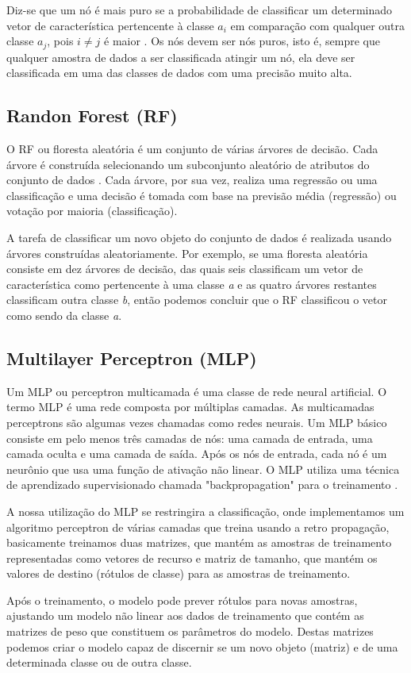Diz-se que um nó é mais puro se a probabilidade de classificar um determinado vetor de característica pertencente à classe $a_i$ em comparação com qualquer outra classe $a_j$, pois $i \not= j$ é maior \cite{scikit-learn}. Os nós devem ser nós puros, isto é, sempre que qualquer amostra de dados a ser classificada atingir um nó, ela deve ser classificada em uma das classes de dados com uma precisão muito alta.  

\subsection{Randon Forest (RF)} 

O RF ou floresta aleatória é um conjunto de várias árvores de decisão. Cada árvore é construída selecionando um subconjunto aleatório de atributos do conjunto de dados \cite{scikit-learn}. Cada árvore, por sua vez, realiza uma regressão ou uma classificação e uma decisão é tomada com base na previsão média (regressão) ou votação por maioria (classificação).  

A tarefa de classificar um novo objeto do conjunto de dados é realizada usando árvores construídas aleatoriamente.  Por exemplo, se uma floresta aleatória consiste em dez árvores de decisão, das quais seis classificam um vetor de característica como pertencente à uma classe \textit{a}  e as quatro árvores restantes classificam outra classe \textit{b}, então podemos concluir que o RF classificou o vetor como sendo da classe \textit{a}.  

\subsection{Multilayer Perceptron (MLP)} 

Um MLP ou perceptron multicamada é uma classe de rede neural artificial. O termo MLP é uma rede composta por múltiplas camadas. As multicamadas perceptrons são algumas vezes chamadas como redes neurais. Um MLP básico consiste em pelo menos três camadas de nós: uma camada de entrada, uma camada oculta e uma camada de saída. Após os nós de entrada, cada nó é um neurônio que usa uma função de ativação não linear. O MLP utiliza uma técnica de aprendizado supervisionado chamada "backpropagation" para o treinamento \cite{astroml}.  

A nossa utilização do MLP se restringira a classificação, onde implementamos um algoritmo perceptron de várias camadas que treina usando a retro propagação, basicamente treinamos duas matrizes, que mantém as amostras de treinamento representadas como vetores de recurso e matriz de tamanho, que mantém os valores de destino (rótulos de classe) para as amostras de treinamento.  

Após o treinamento, o modelo pode prever rótulos para novas amostras, ajustando um modelo não linear aos dados de treinamento que contém as matrizes de peso que constituem os parâmetros do modelo. Destas matrizes podemos criar o modelo capaz de discernir se um novo objeto (matriz) e de uma determinada classe ou de outra classe. 